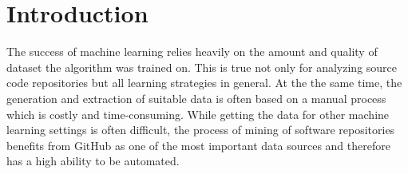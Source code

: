
\section{Introduction}
\label{sec:intro}
The success of machine learning relies heavily on the amount and quality of dataset the algorithm was trained on. This is true not only for analyzing source code repositories but all learning strategies in general. At the the same time, the generation and extraction of suitable data is often based on a manual process which is costly and time-consuming. While getting the data for other machine learning settings is often difficult, the process of mining of software repositories benefits from GitHub as one of the most important data sources and therefore has a high ability to be automated.\\
